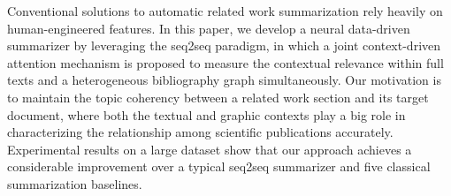 Conventional solutions to automatic related work summarization rely heavily on human-engineered features. In this paper, we develop a neural data-driven summarizer by leveraging the seq2seq paradigm, in which a joint context-driven attention mechanism is proposed to measure the contextual relevance within full texts and a heterogeneous bibliography graph simultaneously. Our motivation is to maintain the topic coherency between a related work section and its target document, where both the textual and graphic contexts play a big role in characterizing the relationship among scientific publications accurately. Experimental results on a large dataset show that our approach achieves a considerable improvement over a typical seq2seq summarizer and five classical summarization baselines.
